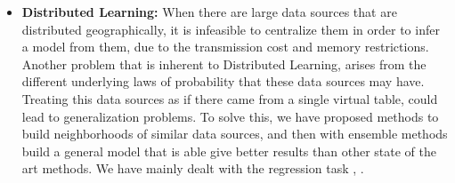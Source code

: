 \begin{itemize}
\item \textbf{Distributed Learning:}
When there are large data sources that are distributed geographically, it
is infeasible to centralize them in order to infer a model from them, due
to the transmission cost and memory restrictions. Another problem that is
inherent to Distributed Learning, arises from the different underlying
laws of probability that these data sources may have. Treating this data
sources as if there came from a single virtual table, could lead to
generalization problems. To solve this, we have proposed methods to build
neighborhoods of similar data sources, and then with ensemble methods
build a general model that is able give better results than other state of
the art methods. We have mainly dealt with the regression task
\cite{Allende13}, \cite{Allende14}. 

\end{itemize}

